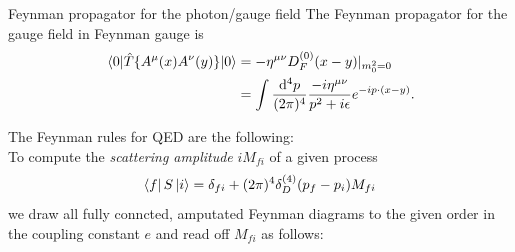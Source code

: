\begin{mybox}{Feynman propagator for the photon/gauge field}
	The Feynman propagator for the gauge field in Feynman gauge is
	\begin{align}
	\expval{\hat{T}\{A^{\mu} (x) A^{\nu}(y) \}}{0} &= - \eta^{\mu \nu} D^{(0)}_F(x-y) |_{m^2_0=0}\nonumber \\
	& = \int \frac{\mathrm{d}^4 p}{(2 \pi)^4} \frac{- i \eta^{\mu \nu}}{p^2 +i \epsilon} e^{-i p\cdot (x-y)}.
	\end{align}
\end{mybox}
\vspace{1cm}
The Feynman rules for QED are the following:\\
To compute the \emph{scattering amplitude} $i M_{fi}$ of a given process
\begin{equation}
\bra{f}S\ket{i} = \delta_{fi} + (2 \pi)^4 \delta^{(4)}_D(p_f-p_i) M_{fi}
\end{equation}
we draw all fully conncted, amputated Feynman diagrams to the given order in the coupling constant $e$ and read off $M_{fi}$ as follows:
